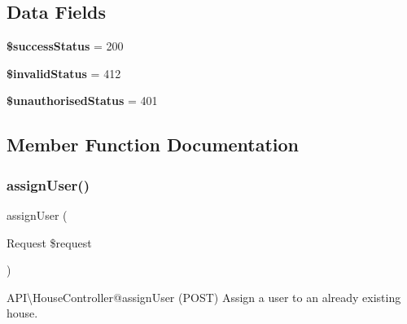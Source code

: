 \subsection*{Data Fields}
\begin{DoxyCompactItemize}
\item 
\mbox{\label{class_app_1_1_http_1_1_controllers_1_1_a_p_i_1_1_house_controller_a4fde01aada3b602338d7002a598a8763}} 
{\bfseries \$success\+Status} = 200
\item 
\mbox{\label{class_app_1_1_http_1_1_controllers_1_1_a_p_i_1_1_house_controller_afce2b73a3afe33067c4398805a121d3c}} 
{\bfseries \$invalid\+Status} = 412
\item 
\mbox{\label{class_app_1_1_http_1_1_controllers_1_1_a_p_i_1_1_house_controller_ab7d5fb8f13267c859829854b90c6f50d}} 
{\bfseries \$unauthorised\+Status} = 401
\end{DoxyCompactItemize}


\subsection{Member Function Documentation}
\mbox{\label{class_app_1_1_http_1_1_controllers_1_1_a_p_i_1_1_house_controller_a755a44e4534f0223d8efff42766142e5}} 
\subsubsection{\texorpdfstring{assignUser()}{assignUser()}}
{\footnotesize\ttfamily assign\+User (\begin{DoxyParamCaption}\item[{Request}]{\$request }\end{DoxyParamCaption})}

\begin{DoxyParagraph}{A\+PI\textbackslash{}\+House\+Controller@assign\+User (P\+O\+ST)}
Assign a user to an already existing house.
\end{DoxyParagraph}

